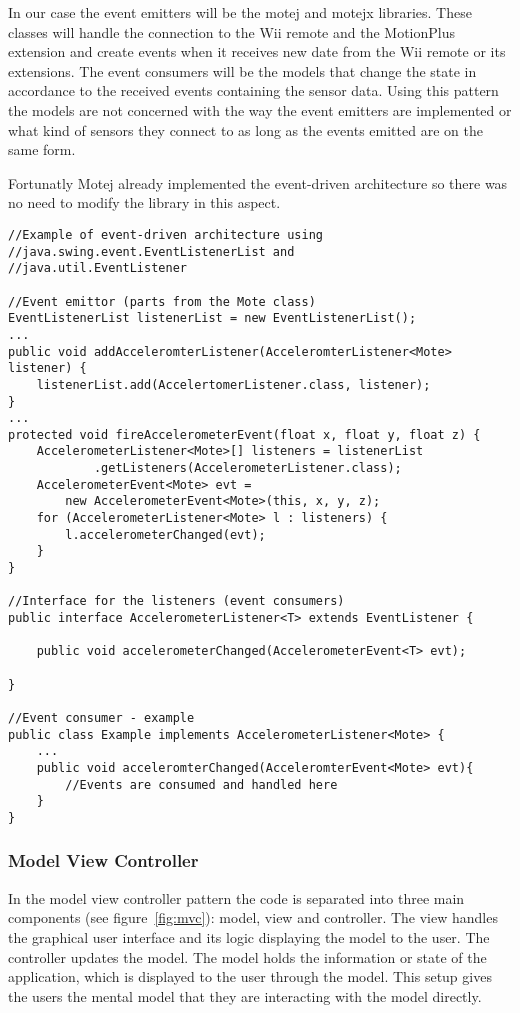 In our case the event emitters will be the motej and motejx libraries. These classes will handle the connection to the Wii remote and the MotionPlus extension and create events when it receives new date from the Wii remote or its extensions. The event consumers will be the models that change the state in accordance to the received events containing the sensor data. Using this pattern the models are not concerned with the way the event emitters are implemented or what kind of sensors they connect to as long as the events emitted are on the same form.

Fortunatly Motej already implemented the event-driven architecture so there was no need to modify the library in this aspect.

\begin{lstlisting}
//Example of event-driven architecture using 
//java.swing.event.EventListenerList and 
//java.util.EventListener

//Event emittor (parts from the Mote class)
EventListenerList listenerList = new EventListenerList();
...
public void addAcceleromterListener(AcceleromterListener<Mote> listener) {
	listenerList.add(AccelertomerListener.class, listener);
}
...
protected void fireAccelerometerEvent(float x, float y, float z) {
	AccelerometerListener<Mote>[] listeners = listenerList
			.getListeners(AccelerometerListener.class);
	AccelerometerEvent<Mote> evt = 
		new AccelerometerEvent<Mote>(this, x, y, z);
	for (AccelerometerListener<Mote> l : listeners) {
		l.accelerometerChanged(evt);
	}
}

//Interface for the listeners (event consumers)
public interface AccelerometerListener<T> extends EventListener {

	public void accelerometerChanged(AccelerometerEvent<T> evt);

}

//Event consumer - example
public class Example implements AccelerometerListener<Mote> {
	...
	public void acceleromterChanged(AcceleromterEvent<Mote> evt){
		//Events are consumed and handled here
	}
}
\end{lstlisting}

\subsubsection{Model View Controller}
In the model view controller pattern the code is separated into three main components (see figure~\ref{fig:mvc}): model, view and controller. The view handles the graphical user interface and its logic displaying the model to the user. The controller updates the model. The model holds the information or state of the application, which is displayed to the user through the model. This setup gives the users the mental model that they are interacting with the model directly.

